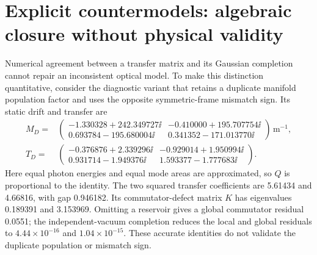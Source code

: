 \section{Explicit countermodels: algebraic closure without physical validity}
\label{app:gc-countermodels}

Numerical agreement between a transfer matrix and its Gaussian completion
cannot repair an inconsistent optical model. To make this distinction
quantitative, consider the diagnostic variant that retains a duplicate
manifold population factor and uses the opposite symmetric-frame mismatch
sign. Its static drift and transfer are
\begin{align}
 M_D={}&\begin{pmatrix}
 -1.330328+242.349727\ii&-0.410000+195.707754\ii\\
 0.693784-195.680004\ii&0.341352-171.013770\ii
 \end{pmatrix}\,\mathrm{m}^{-1},\label{eq:gc-countermodel-drift}\\
 T_D={}&\begin{pmatrix}
 -0.376876+2.339296\ii&-0.929014+1.950994\ii\\
 0.931714-1.949376\ii&1.593377-1.777683\ii
 \end{pmatrix}.
 \label{eq:gc-countermodel-transfer}
\end{align}
Here equal photon energies and equal mode areas are approximated, so $Q$
is proportional to the identity. The two squared transfer coefficients are
5.61434 and 4.66816, with gap 0.946182. Its commutator-defect matrix $K$
has eigenvalues 0.189391 and 3.153969. Omitting a reservoir gives a global
commutator residual 0.0551; the independent-vacuum completion reduces the
local and global residuals to $4.44\times10^{-16}$ and $1.04\times10^{-15}$.
These accurate identities do not validate the duplicate population or
mismatch sign.


